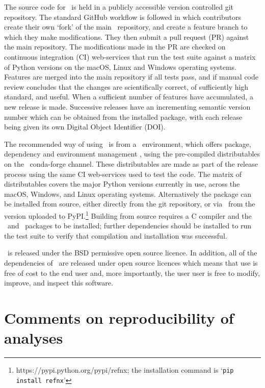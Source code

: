 \documentclass[pdf,preprint]{iucr}
\begin{document}
The source code for \ is held in a publicly accessible version controlled git repository\cite{refnx}. The standard GitHub workflow is followed in which contributors create their own `fork' of the main \ repository, and create a feature branch to which they make modifications. They then submit a pull request (PR) against the main repository. The modifications made in the PR are checked on continuous integration (CI) web-services that run the test suite against a matrix of Python versions on the macOS, Linux and Windows operating systems. Features are merged into the main repository if all tests pass, and if manual code review concludes that the changes are scientifically correct, of sufficiently high standard, and useful. When a sufficient number of features have accumulated, a new release is made. Successive releases have an incrementing semantic version number which can be obtained from the installed package, with each release being given its own Digital Object Identifier (DOI).

The recommended way of using \ is from a \conda\ environment, which offers package, dependency and environment management \cite{conda}, using the pre-compiled distributables on the \ conda-forge channel. These distributables are made as part of the release process using the same CI web-services used to test the code. The matrix of distributables covers the major Python versions currently in use, across the macOS, Windows, and Linux operating systems. Alternatively the package can be installed from source, either directly from the git repository, or via \pip\ from the version uploaded to PyPI.\footnote{https://pypi.python.org/pypi/refnx; the installation command is `\texttt{pip install refnx}'} Building from source requires a C compiler and the \Cython\ and \NumPy\ packages to be installed; further dependencies should be installed to run the test suite to verify that compilation and installation was successful.

\ is released under the BSD permissive open source licence. In addition, all of the  dependencies of \ are released under open source licences which means that use is free of cost to the end user and, more importantly, the user user is free to modify, improve, and inspect this software.

\section{Comments on reproducibility of analyses}
\end{document}

